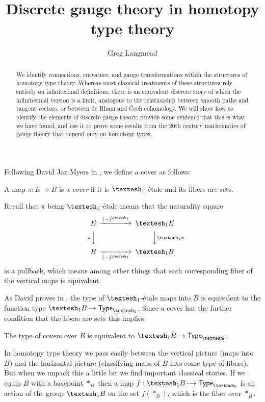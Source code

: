 \documentclass[12pt]{article}
\title{Discrete gauge theory in homotopy type theory}
\author{Greg Langmead}
\begin{document}
\begin{abstract}
We identify connections, curvature, and gauge transformations within the structures of homotopy type theory. Whereas most classical treatments of these structures rely entirely on infinitesimal definitions, there is an equivalent discrete story of which the infinitesimal version is a limit, analogous to the relationship between smooth paths and tangent vectors, or between de Rham and Čech cohomology. We will show how to identify the elements of discrete gauge theory, provide some evidence that this is what we have found, and use it to prove some results from the 20th century mathematics of gauge theory that depend only on homotopy types.
\end{abstract}



Following David Jaz Myers in \cite{myersgood}, we define a cover as follows:

\begin{mydef}
  A map \(\pi:E\to B\) is a \emph{cover} if it is \(\shapeo\)-étale and its fibers are sets.
\end{mydef}

Recall that \(\pi\) being \(\shapeo\)-étale means that the naturality square 
\[
\begin{CD}
E @>(-)^{\shapeo}>> \shapeo E \\
@V{\pi}VV @VV{\shapeo \pi}V \\
B @>>(-)^{\shapeo}> \shapeo B
\end{CD}
\]
is a pullback, which means among other things that each corresponding fiber of the vertical maps is equivalent.

As David proves in \cite{myersgood}, the type of \(\shapeo\)-étale maps into \(B\) is equivalent to the function type \(\shapeo B \to \Typeo\). Since a cover has the further condition that the fibers are sets this implies

\begin{mylemma}
  The type of covers over \(B\) is equivalent to \(\shapeo B \to \Type_{\shapez}\).
\end{mylemma}

In homotopy type theory we pass easily between the vertical picture (maps into \(B\)) and the horizontal picture (classifying maps of \(B\) into some type of fibers). But when we unpack this a little bit we find important classical stories. If we equip \(B\) with a basepoint \(*_B\) then a map \(f:\shapeo B \dotto \Type_{\shapez}\) is an action of the group \(\shapeo B\) on the set \(f(*_B)\), which is the fiber over \(*_B\).
\end{document}
